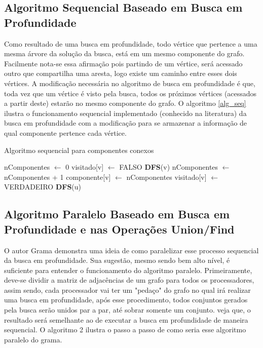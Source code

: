\documentclass[12pt]{article}
\begin{document}
\subsection{Algoritmo Sequencial Baseado em Busca em Profundidade}

Como resultado de uma busca em profundidade, todo vértice que pertence a uma mesma árvore da solução da busca, está em um mesmo componente do grafo. Facilmente nota-se essa afirmação pois partindo de um vértice, será acessado outro que compartilha uma aresta, logo existe um caminho entre esses dois vértices. A modificação necessária no algoritmo de busca em profundidade é que, toda vez que um vértice é visto pela busca, todos os próximos vértices (acessados a partir deste) estarão no mesmo componente do grafo. O algoritmo \ref{alg_seq} ilustra o funcionamento sequencial implementado (conhecido na literatura) da busca em profundidade com a modificação para se armazenar a informação de qual componente pertence cada vértice.

\begin{algorithm}[htp!]
    \DontPrintSemicolon
    \caption{Algoritmo sequencial para componentes conexos}
    \label{alg_seq}
	{
        nComponentes $\gets$ 0\;
        {
            visitado[v] $\gets$ FALSO\;
        }
        {
            {
                \textbf{DFS}(v)\;
                nComponentes $\gets$ nComponentes + 1\;
            }
        }
    }
    {
        componente[v] $\gets$ nComponentes\; 
        visitado[v] $\gets$ VERDADEIRO\;
        {
            {
                \textbf{DFS}(u)\;
            }
        }
    }
\end{algorithm}

\subsection{Algoritmo Paralelo Baseado em Busca em Profundidade e nas Operações Union/Find}

O autor Grama demonstra uma ideia de como paralelizar esse processo sequencial da busca em profundidade. Sua sugestão, mesmo sendo bem alto nível, é suficiente para entender o funcionamento do algoritmo paralelo. Primeiramente, deve-se dividir a matriz de adjacências de um grafo para todos os processadores, assim sendo, cada processador vai ter um "pedaço" do grafo no qual irá realizar uma busca em profundidade, após esse procedimento, todos conjuntos gerados pela busca serão unidos par a par, até sobrar somente um conjunto. veja que, o resultado será semelhante ao de executar a busca em profundidade de maneira sequencial. O algoritmo 2 ilustra o passo a passo de como seria esse algoritmo paralelo do grama.
\end{document}
